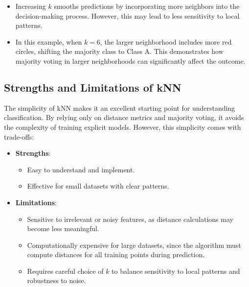 \documentclass[
]{book}
\providecommand{\tightlist}{%
  \setlength{\itemsep}{0pt}\setlength{\parskip}{0pt}}
\theoremstyle{definition}
\theoremstyle{definition}
\theoremstyle{definition}
\theoremstyle{definition}
\theoremstyle{remark}
\begin{document}
\begin{itemize}
\tightlist
\item
  Increasing \(k\) smooths predictions by incorporating more neighbors into the decision-making process. However, this may lead to less sensitivity to local patterns.\\
\item
  In this example, when \(k = 6\), the larger neighborhood includes more red circles, shifting the majority class to Class A. This demonstrates how majority voting in larger neighborhoods can significantly affect the outcome.
\end{itemize}

\subsection*{Strengths and Limitations of kNN}\label{strengths-and-limitations-of-knn}

The simplicity of kNN makes it an excellent starting point for understanding classification. By relying only on distance metrics and majority voting, it avoids the complexity of training explicit models. However, this simplicity comes with trade-offs:

\begin{itemize}
\tightlist
\item
  \textbf{Strengths}:

  \begin{itemize}
  \tightlist
  \item
    Easy to understand and implement.\\
  \item
    Effective for small datasets with clear patterns.
  \end{itemize}
\item
  \textbf{Limitations}:

  \begin{itemize}
  \tightlist
  \item
    Sensitive to irrelevant or noisy features, as distance calculations may become less meaningful.\\
  \item
    Computationally expensive for large datasets, since the algorithm must compute distances for all training points during prediction.\\
  \item
    Requires careful choice of \(k\) to balance sensitivity to local patterns and robustness to noise.
  \end{itemize}
\end{itemize}
\end{document}

